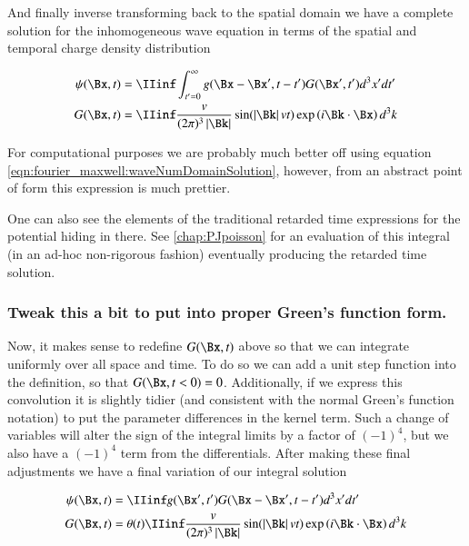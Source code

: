And finally inverse transforming back to the spatial domain we have a complete solution for the inhomogeneous wave equation in terms of the spatial and temporal charge density distribution

\begin{align}
{\psi}(\Bx, t)
&= \IIinf \int_{t' = 0}^\infty g(\Bx -\Bx', t-t') G(\Bx', t') d^3 x' dt' \\
G(\Bx, t)
&= \IIinf
\frac{v}{(2\pi)^3 \Abs{\Bk}}
\sin( \Abs{\Bk} v t )
\exp\left( i \Bk \cdot \Bx \right)
d^3 k
\end{align}

For computational purposes we are probably much better off using
equation \ref{eqn:fourier_maxwell:waveNumDomainSolution}, however,
from an abstract point of form this expression is much prettier.

One can also see the elements of the traditional retarded time expressions for the potential hiding in there.  See
\ref{chap:PJpoisson} for an evaluation of this integral (in an ad-hoc
non-rigorous fashion) eventually producing the retarded time solution.

\subsubsection{Tweak this a bit to put into proper Green's function form. }

Now, it makes sense to redefine $G(\Bx,t)$ above so that we can integrate
uniformly over all space and time.  To do so we can add a unit step function
into the definition, so that $G(\Bx,t<0) = 0$.
Additionally, if we express this convolution it is slightly tidier (and consistent with the normal Green's function notation)
to put the parameter differences in the kernel term.  Such a change of variables will alter the sign of the integral limits
by a factor of $(-1)^4$, but we also have a $(-1)^4$ term from the differentials.  After making these final adjustments
we have a final variation of our integral solution

%
% 
%
%
% 
% 
\begin{align}
{\psi}(\Bx, t)
&= \IIinf g(\Bx', t') G(\Bx - \Bx', t - t') d^3 x' dt' \\
G(\Bx, t)
&= \theta(t) \IIinf
\frac{v}{(2\pi)^3 \Abs{\Bk}}
\sin( \Abs{\Bk} v t )
\exp\left( i \Bk \cdot \Bx \right)
d^3 k
\end{align}

